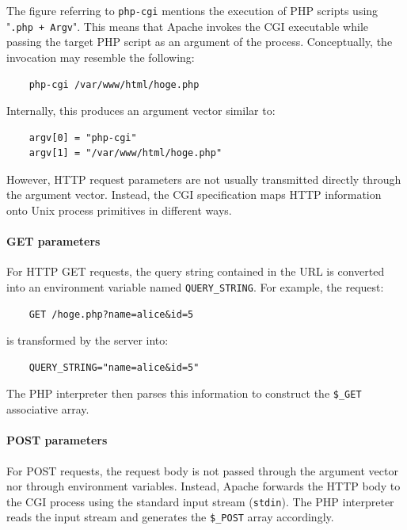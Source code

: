 \documentclass{scrbook}
\begin{document}
	The figure referring to \texttt{php-cgi} mentions the execution of PHP scripts using "\texttt{.php + Argv}". This means that Apache invokes the CGI executable while passing the target PHP script as an argument of the process. Conceptually, the invocation may resemble the following:
	
	\begin{lstlisting}
	php-cgi /var/www/html/hoge.php
	\end{lstlisting}
	
	Internally, this produces an argument vector similar to:
	
	\begin{lstlisting}
	argv[0] = "php-cgi"
	argv[1] = "/var/www/html/hoge.php"
	\end{lstlisting}
	
	However, HTTP request parameters are not usually transmitted directly through the argument vector. Instead, the CGI specification maps HTTP information onto Unix process primitives in different ways.
	
	\paragraph{GET parameters}
	
	For HTTP GET requests, the query string contained in the URL is converted into an environment variable named \texttt{QUERY\_STRING}. For example, the request:
	
	\begin{lstlisting}
	GET /hoge.php?name=alice&id=5
	\end{lstlisting}
	
	is transformed by the server into:
	
	\begin{lstlisting}
	QUERY_STRING="name=alice&id=5"
	\end{lstlisting}
	
	The PHP interpreter then parses this information to construct the \texttt{\$\_GET} associative array.
	
	\paragraph{POST parameters}
	
	For POST requests, the request body is not passed through the argument vector nor through environment variables. Instead, Apache forwards the HTTP body to the CGI process using the standard input stream (\texttt{stdin}). The PHP interpreter reads the input stream and generates the \texttt{\$\_POST} array accordingly.
	
\end{document}
